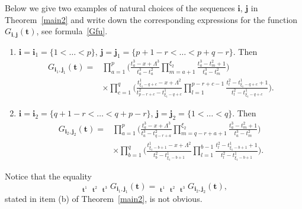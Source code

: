\documentclass[10pt,a4paper]{amsart}
\numberwithin{equation}{section}
\DeclareMathOperator{\Symb}{\overline{Sym} }
\begin{document}
\begin{Example} Below we give two examples of natural choices of the sequences $\boldsymbol{i}$, $\boldsymbol{j}$ in Theorem~\ref{main2} and write down the corresponding expressions for the function $G_{\boldsymbol{i},\boldsymbol{j}}( \boldsymbol{t})$, see formula~\eqref{Gfu}.
\begin{enumerate}\itemsep=0pt
\item[$(a)$]
$\boldsymbol{i}=\boldsymbol{i}_1=\{1<\dots<p\}$, $\boldsymbol{j}=\boldsymbol{j}_1=\{p+1-r<\dots<p+q-r\}$. Then
\begin{align*}
G_{\boldsymbol{i}_1,\boldsymbol{j}_1}( \boldsymbol{t})={}& \prod_{a=1}^{p}\Biggl( \frac{t^3_a-x+\Lambda^3}{t_a^3-t^2_a}\prod_{ m=a+1}^{\xi_2} \frac{t_a^3-t^2_m+1}{t_a^3-t^2_m}\Biggr)\\
&{\times}\prod_{c=1}^{q} \Biggl( \frac{t_{\xi_1-q+c}^1-x+\Lambda^2}{t^2_{p-r+c}-t^1_{\xi_1-q+c}}\prod_{ l=1}^{p-r+c-1} \frac{t^2_l-t_{\xi_1-q+c}^1+1}{t^2_l-t^1_{\xi_1-q+c}}\Biggr).
\end{align*}

\item[$(b)$] $\boldsymbol{i}=\boldsymbol{i}_2=\{q+1-r< \dots<q+p-r\}$, $\boldsymbol{j}=\boldsymbol{j}_2=\{1<\dots<q\}$. Then
\begin{align*}
G_{\boldsymbol{i}_2,\boldsymbol{j}_2}( \boldsymbol{t})={}& \prod_{a=1}^{p}\Biggl( \frac{t^3_a-x+\Lambda^3}{t_a^3-t^2_{q-r+a}}\prod_{ m=q-r+a+1}^{\xi_2} \frac{t_a^3-t^2_m+1}{t_a^3-t^2_m}\Biggr)\\
&{\times}\prod_{b=1}^{q} \Biggl( \frac{t_{\xi_1-b+1}^1-x+\Lambda^2}{t^2_{b}-t^1_{\xi_1-b+1}} \prod_{ l=1}^{b-1} \frac{t^2_l-t_{\xi_1-b+1}^1+1}{t^2_l-t^1_{\xi_1-b+1}}\Biggr).
\end{align*}
\end{enumerate}
Notice that the equality
\begin{equation*}
\Symb_{\boldsymbol{t}^1} \Symb_{\boldsymbol{t}^2} \Symb_{\boldsymbol{t}^3} G_{\boldsymbol{i}_1,\boldsymbol{j}_1}(\boldsymbol{t}) = \Symb_{\boldsymbol{t}^1} \Symb_{\boldsymbol{t}^2} \Symb_{\boldsymbol{t}^3} G_{\boldsymbol{i}_2,\boldsymbol{j}_2}(\boldsymbol{t}), \end{equation*}
stated in item (b) of Theorem~\ref{main2}, is not obvious.
\end{Example}
\end{document}
